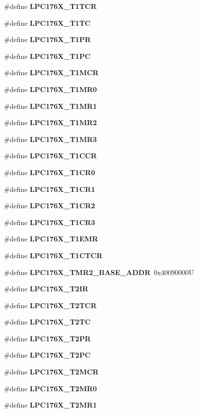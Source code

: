 \begin{DoxyCompactItemize}
\#define {\bfseries L\+P\+C176\+X\+\_\+\+T1\+T\+CR}
\item 
\#define {\bfseries L\+P\+C176\+X\+\_\+\+T1\+TC}
\item 
\#define {\bfseries L\+P\+C176\+X\+\_\+\+T1\+PR}
\item 
\#define {\bfseries L\+P\+C176\+X\+\_\+\+T1\+PC}
\item 
\#define {\bfseries L\+P\+C176\+X\+\_\+\+T1\+M\+CR}
\item 
\#define {\bfseries L\+P\+C176\+X\+\_\+\+T1\+M\+R0}
\item 
\#define {\bfseries L\+P\+C176\+X\+\_\+\+T1\+M\+R1}
\item 
\#define {\bfseries L\+P\+C176\+X\+\_\+\+T1\+M\+R2}
\item 
\#define {\bfseries L\+P\+C176\+X\+\_\+\+T1\+M\+R3}
\item 
\#define {\bfseries L\+P\+C176\+X\+\_\+\+T1\+C\+CR}
\item 
\#define {\bfseries L\+P\+C176\+X\+\_\+\+T1\+C\+R0}
\item 
\#define {\bfseries L\+P\+C176\+X\+\_\+\+T1\+C\+R1}
\item 
\#define {\bfseries L\+P\+C176\+X\+\_\+\+T1\+C\+R2}
\item 
\#define {\bfseries L\+P\+C176\+X\+\_\+\+T1\+C\+R3}
\item 
\#define {\bfseries L\+P\+C176\+X\+\_\+\+T1\+E\+MR}
\item 
\#define {\bfseries L\+P\+C176\+X\+\_\+\+T1\+C\+T\+CR}
\item 
\mbox{\label{timer-defs_8h_a447da9ee95abae18fad00aee1655b8b7}} 
\#define {\bfseries L\+P\+C176\+X\+\_\+\+T\+M\+R2\+\_\+\+B\+A\+S\+E\+\_\+\+A\+D\+DR}~0x40090000U
\item 
\#define {\bfseries L\+P\+C176\+X\+\_\+\+T2\+IR}
\item 
\#define {\bfseries L\+P\+C176\+X\+\_\+\+T2\+T\+CR}
\item 
\#define {\bfseries L\+P\+C176\+X\+\_\+\+T2\+TC}
\item 
\#define {\bfseries L\+P\+C176\+X\+\_\+\+T2\+PR}
\item 
\#define {\bfseries L\+P\+C176\+X\+\_\+\+T2\+PC}
\item 
\#define {\bfseries L\+P\+C176\+X\+\_\+\+T2\+M\+CR}
\item 
\#define {\bfseries L\+P\+C176\+X\+\_\+\+T2\+M\+R0}
\item 
\#define {\bfseries L\+P\+C176\+X\+\_\+\+T2\+M\+R1}
\item 

\end{DoxyCompactItemize}
